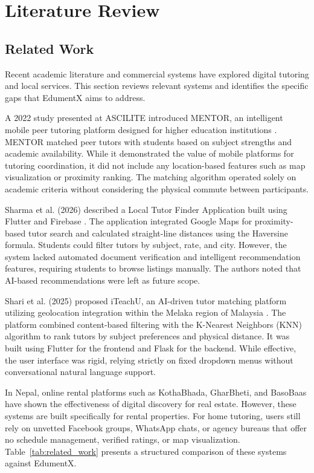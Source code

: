 \documentclass[12pt]{report}
\begin{document}
\newpage
\chapter{Literature Review}

\section{Related Work}
Recent academic literature and commercial systems have explored digital tutoring and local services. This section reviews relevant systems and identifies the specific gaps that EdumentX aims to address.

A 2022 study presented at ASCILITE introduced MENTOR, an intelligent mobile peer tutoring platform designed for higher education institutions \cite{Chung2022MENTOR}. MENTOR matched peer tutors with students based on subject strengths and academic availability. While it demonstrated the value of mobile platforms for tutoring coordination, it did not include any location-based features such as map visualization or proximity ranking. The matching algorithm operated solely on academic criteria without considering the physical commute between participants.

Sharma et al. (2026) described a Local Tutor Finder Application built using Flutter and Firebase \cite{Sharma2026LocalTutor}. The application integrated Google Maps for proximity-based tutor search and calculated straight-line distances using the Haversine formula. Students could filter tutors by subject, rate, and city. However, the system lacked automated document verification and intelligent recommendation features, requiring students to browse listings manually. The authors noted that AI-based recommendations were left as future scope.

Shari et al. (2025) proposed iTeachU, an AI-driven tutor matching platform utilizing geolocation integration within the Melaka region of Malaysia \cite{Shari2025iTeachU}. The platform combined content-based filtering with the K-Nearest Neighbors (KNN) algorithm to rank tutors by subject preferences and physical distance. It was built using Flutter for the frontend and Flask for the backend. While effective, the user interface was rigid, relying strictly on fixed dropdown menus without conversational natural language support.

In Nepal, online rental platforms such as KothaBhada, GharBheti, and BasoBaas have shown the effectiveness of digital discovery for real estate. However, these systems are built specifically for rental properties. For home tutoring, users still rely on unvetted Facebook groups, WhatsApp chats, or agency bureaus that offer no schedule management, verified ratings, or map visualization. Table~\ref{tab:related_work} presents a structured comparison of these systems against EdumentX.
\end{document}
